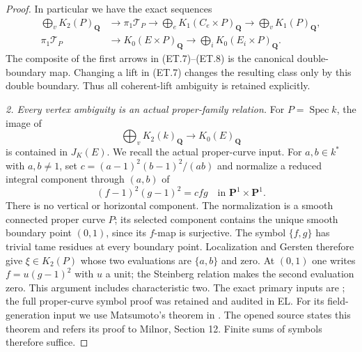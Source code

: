 \begin{proof}
In particular we have the exact sequences
\begin{align}
 \bigoplus_vK_2(P)_{\mathbf Q}&\longrightarrow\pi_1\mathcal T_P
   \longrightarrow\bigoplus_eK_1(C_e\times P)_{\mathbf Q}
   \longrightarrow\bigoplus_vK_1(P)_{\mathbf Q},        \tag{ET.7}\\
 \pi_1\mathcal T_P&\longrightarrow K_0(E\times P)_{\mathbf Q}
       \longrightarrow\bigoplus_iK_0(E_i\times P)_{\mathbf Q}.
                                                        \tag{ET.8}
\end{align}
The composite of the first arrows in (ET.7)--(ET.8) is the canonical
double-boundary map. Changing a lift in (ET.7) changes the resulting
class only by this double boundary. Thus all coherent-lift ambiguity
is retained explicitly.

\emph{2. Every vertex ambiguity is an actual proper-family relation.}
For $P=\operatorname{Spec}k$, the image of
\[
                  \bigoplus_vK_2(k)_{\mathbf Q}
                      \longrightarrow K_0(E)_{\mathbf Q}
\]
is contained in $J_K(E)$. We recall the actual proper-curve input.
For $a,b\in k^*$ with $a,b\ne1$, set
$c=(a-1)^2(b-1)^2/(ab)$ and normalize a reduced integral component
through $(a,b)$ of
\[
                   (f-1)^2(g-1)^2=cfg
                \quad\text{in }\mathbf P^1\times\mathbf P^1.
\]
There is no vertical or horizontal component. The normalization is a
smooth connected proper curve $P$; its selected component contains the
unique smooth boundary point $(0,1)$, since its $f$-map is surjective.
The symbol $\{f,g\}$ has trivial tame residues at every boundary point.
Localization and Gersten therefore give $\xi\in K_2(P)$ whose two
evaluations are $\{a,b\}$ and zero. At $(0,1)$ one writes
$f=u(g-1)^2$ with $u$ a unit; the Steinberg relation makes the second
evaluation zero. This argument includes characteristic two. The exact
primary inputs are \citet[Section 7, Proposition 3.2, equation (3.3),
and Theorem 5.11]{rootQuillen1973}; the full proper-curve symbol proof
was retained and audited in EL. For its field-generation input we use
Matsumoto's theorem in \citet[Chapter III, Section 6, Theorem 6.1,
chapter p.~48]{frWeibelKbookIII}. The opened source states this theorem
and refers its proof to Milnor, Section 12. Finite sums of symbols
therefore suffice.


\end{proof}
